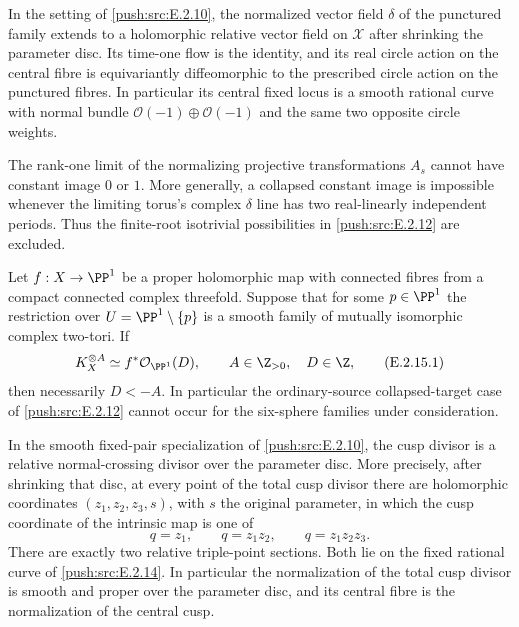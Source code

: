 \begin{proposition}\hypertarget{tag-032Z}{}\label{push:src:E.2.14}


In the setting of \ref{push:src:E.2.10}, the normalized vector field
$\delta$ of the punctured family extends to a holomorphic
relative vector field on $\mathcal X$ after shrinking
the parameter disc.  Its time-one flow is the identity,
and its real circle action on the central fibre is
equivariantly diffeomorphic to the prescribed circle
action on the punctured fibres.  In particular its
central fixed locus is a smooth rational curve with
normal bundle $\mathcal O(-1)\oplus\mathcal O(-1)$
and the same two opposite circle weights.

The rank-one limit of the normalizing projective
transformations $A_s$ cannot have constant image
$0$ or $1$.  More generally, a collapsed constant
image is impossible whenever the limiting torus's
complex $\delta$ line has two real-linearly
independent periods.  Thus the finite-root
isotrivial possibilities in \ref{push:src:E.2.12} are excluded.
\end{proposition}

\begin{proposition}\hypertarget{tag-0330}{}\label{push:src:E.2.15}


Let $f:X\to\PP^1$ be a proper holomorphic map with connected
fibres from a compact connected complex threefold.  Suppose
that for some $p\in\PP^1$ the restriction over
$U=\PP^1\setminus\{p\}$ is a smooth family of mutually
isomorphic complex two-tori.  If
\[
 K_X^{\otimes A}\simeq f^*\mathcal O_{\PP^1}(D),
 \qquad A\in\Z_{>0},\quad D\in\Z,
 \tag{E.2.15.1}
\]
then necessarily $D<-A$.  In particular the ordinary-source
collapsed-target case of \ref{push:src:E.2.12} cannot occur for the
six-sphere families under consideration.
\end{proposition}

\begin{proposition}\hypertarget{tag-0332}{}\label{push:src:E.2.17}


In the smooth fixed-pair specialization of \ref{push:src:E.2.10},
the cusp divisor is a relative normal-crossing divisor
over the parameter disc.  More precisely, after
shrinking that disc, at every point of the total cusp
divisor there are holomorphic coordinates
$(z_1,z_2,z_3,s)$, with $s$ the original parameter,
in which the cusp coordinate of the intrinsic map is
one of
\[
 q=z_1,\qquad q=z_1z_2,\qquad q=z_1z_2z_3.
 \tag{E.2.17.1}
\]
There are exactly two relative triple-point sections.
Both lie on the fixed rational curve of \ref{push:src:E.2.14}.
In particular the normalization of the total cusp
divisor is smooth and proper over the parameter
disc, and its central fibre is the normalization
of the central cusp.
\end{proposition}

